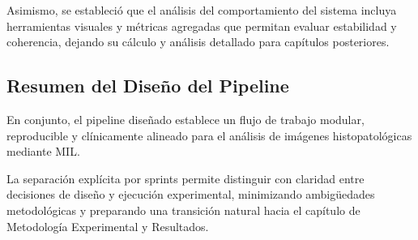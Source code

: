 Asimismo, se estableció que el análisis del comportamiento del sistema incluya herramientas visuales y métricas agregadas que permitan evaluar estabilidad y coherencia, dejando su cálculo y análisis detallado para capítulos posteriores.

\subsection{Resumen del Diseño del Pipeline}

En conjunto, el pipeline diseñado establece un flujo de trabajo modular, reproducible y clínicamente alineado para el análisis de imágenes histopatológicas mediante MIL.\newline

La separación explícita por sprints permite distinguir con claridad entre decisiones de diseño y ejecución experimental, minimizando ambigüedades metodológicas y preparando una transición natural hacia el capítulo de Metodología Experimental y Resultados.
